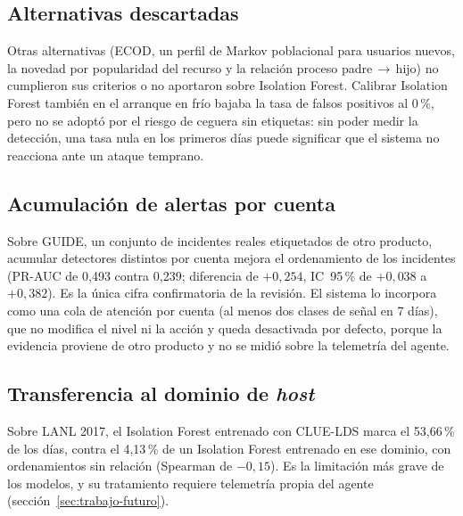 \subsection{Alternativas descartadas}
\label{sec:revision-descartadas}
Otras alternativas (ECOD, un perfil de Markov poblacional para usuarios nuevos, la novedad por popularidad del recurso y la relación proceso padre\,$\rightarrow$\,hijo) no cumplieron sus criterios o no aportaron sobre Isolation Forest. Calibrar Isolation Forest también en el arranque en frío bajaba la tasa de falsos positivos al 0\,\%, pero no se adoptó por el riesgo de ceguera sin etiquetas: sin poder medir la detección, una tasa nula en los primeros días puede significar que el sistema no reacciona ante un ataque temprano.

\subsection{Acumulación de alertas por cuenta}
\label{sec:revision-cola-cuenta}
Sobre GUIDE, un conjunto de incidentes reales etiquetados de otro producto, acumular detectores distintos por cuenta mejora el ordenamiento de los incidentes (PR-AUC de 0,493 contra 0,239; diferencia de $+0{,}254$, IC~95\,\% de $+0{,}038$ a $+0{,}382$). Es la única cifra confirmatoria de la revisión. El sistema lo incorpora como una cola de atención por cuenta (al menos dos clases de señal en 7 días), que no modifica el nivel ni la acción y queda desactivada por defecto, porque la evidencia proviene de otro producto y no se midió sobre la telemetría del agente.

\subsection{Transferencia al dominio de \emph{host}}
\label{sec:revision-transferencia}
Sobre LANL 2017, el Isolation Forest entrenado con CLUE-LDS marca el 53,66\,\% de los días, contra el 4,13\,\% de un Isolation Forest entrenado en ese dominio, con ordenamientos sin relación (Spearman de $-0{,}15$). Es la limitación más grave de los modelos, y su tratamiento requiere telemetría propia del agente (sección~\ref{sec:trabajo-futuro}).


